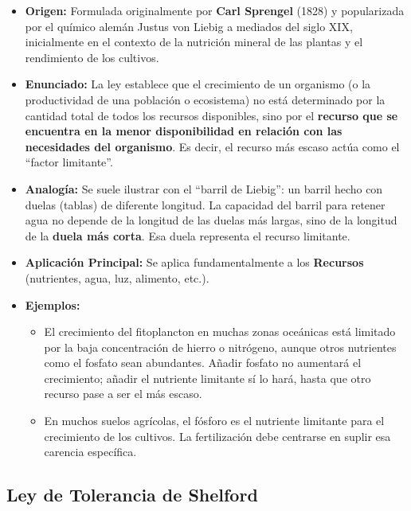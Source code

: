 \documentclass[
]{book}
\providecommand{\tightlist}{%
  \setlength{\itemsep}{0pt}\setlength{\parskip}{0pt}}
\begin{document}
\begin{itemize}
\tightlist
\item
  \textbf{Origen:} Formulada originalmente por \textbf{Carl Sprengel} (1828) y popularizada por el químico alemán Justus von Liebig a mediados del siglo XIX, inicialmente en el contexto de la nutrición mineral de las plantas y el rendimiento de los cultivos.
\item
  \textbf{Enunciado:} La ley establece que el crecimiento de un organismo (o la productividad de una población o ecosistema) no está determinado por la cantidad total de todos los recursos disponibles, sino por el \textbf{recurso que se encuentra en la menor disponibilidad en relación con las necesidades del organismo}. Es decir, el recurso más escaso actúa como el ``factor limitante''.
\item
  \textbf{Analogía:} Se suele ilustrar con el ``barril de Liebig'': un barril hecho con duelas (tablas) de diferente longitud. La capacidad del barril para retener agua no depende de la longitud de las duelas más largas, sino de la longitud de la \textbf{duela más corta}. Esa duela representa el recurso limitante.
\item
  \textbf{Aplicación Principal:} Se aplica fundamentalmente a los \textbf{Recursos} (nutrientes, agua, luz, alimento, etc.).
\item
  \textbf{Ejemplos:}

  \begin{itemize}
  \tightlist
  \item
    El crecimiento del fitoplancton en muchas zonas oceánicas está limitado por la baja concentración de hierro o nitrógeno, aunque otros nutrientes como el fosfato sean abundantes. Añadir fosfato no aumentará el crecimiento; añadir el nutriente limitante sí lo hará, hasta que otro recurso pase a ser el más escaso.
  \item
    En muchos suelos agrícolas, el fósforo es el nutriente limitante para el crecimiento de los cultivos. La fertilización debe centrarse en suplir esa carencia específica.
  \end{itemize}
\end{itemize}

\subsection*{\texorpdfstring{\textbf{Ley de Tolerancia de Shelford}}{Ley de Tolerancia de Shelford}}\label{shelford}
\end{document}
